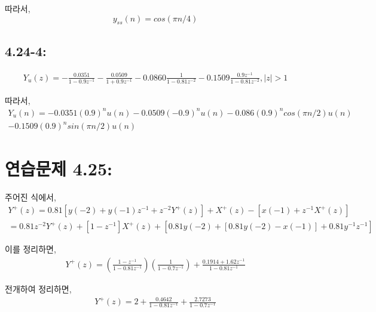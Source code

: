 \documentclass[11pt
  , a4paper
  , article
  , oneside
]{memoir}
\begin{document}
따라서,
\begin {equation}
y_{ss}(n)= cos(\pi n/4) \nonumber
\end {equation}

\section{4.24-4: }
\begin {equation}
\begin {split}
Y_{u}(z)=-\frac{0.0351}{1-0.9z^{-1}}-\frac{0.0509}{1+0.9z^{-1}} - 0.0860\frac{1}{1-0.81z^{-2}} - 0.1509\frac{0.9z^{-1}}{1-0.81z^{-2}}, |z| >1    \nonumber
\end{split}
\end {equation}

따라서,
\begin {equation}
\begin {split}
Y_{u}(n)= -0.0351(0.9)^nu(n) - 0.0509(-0.9)^nu(n) - 0.086(0.9)^n cos(\pi n/2)u(n) & \\
-0.1509(0.9)^n sin(\pi n/2)u(n)    \nonumber
\end{split}
\end {equation}


\chapter{연습문제 4.25: }
주어진 식에서,
\begin {equation}
\begin {split}
Y^+(z) = 0.81[y(-2)+y(-1)z^{-1}+z^{-2}Y^+(z)] + X^+(z) -[x(-1)+z^{-1}X^+(z)]  &\\ 
= 0.81z^{-2}Y^+(z)+[1-z^{-1}]X^+(z) + [0.81y(-2)+[0.81y(-2) - x(-1)] + 0.81y^{-1}z^{-1}]
\nonumber
\end{split}
\end {equation}

이를 정리하면,
\begin {equation}
\begin {split}
Y^+(z) = (\frac{1-z^{-1}}{1-0.81z^{-1}})(\frac{1}{1-0.7z^{-1}}) + \frac{0.1914+1.62z^{-1}}{1-0.81z^{-1}}
\nonumber
\end{split}
\end {equation}

전개하여 정리하면,
\begin {equation}
\begin {split}
Y^+(z) = 2 + \frac{0.4642}{1-0.81z^{-1}} + \frac{2.7273}{1-0.7z^{-1}}
\nonumber
\end{split}
\end {equation}
\end{document}
